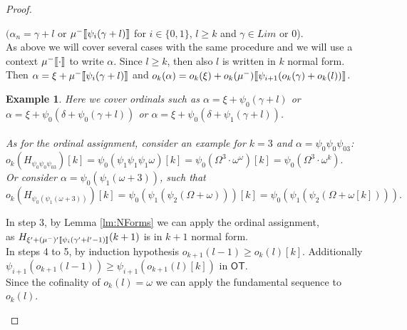 \documentclass{amsart}
\theoremstyle{plain}
\theoremstyle{plain}
\newtheorem{example}[theorem]{Example}
\def\scbrl{[\hspace{-.14em}[}
\def\scbrr{]\hspace{-.14em}]}
\def\scbr#1{\scbrl#1\scbrr}
\newcommand\OT{\mathsf{OT}}
\newcommand{\Om}{{\Omega}}
\newcommand{\okpe}{o_{k+1}}
\newcommand{\ok}{o_{k}}
\newcommand{\al}{{\alpha}}
\newcommand{\ga}{\gamma}
\newcommand{\de}{\delta}
\newcommand{\om}{\omega}
\def\scbrl{[\hspace{-.14em}[}
\def\scbrr{]\hspace{-.14em}]}
\def\scbr#1{\scbrl#1\scbrr}
\begin{document}
\begin{proof}
\begin{Cases}
\begin{Cases}
\begin{Cases}
            
            \item \label{CaseNotSucc} $(\al_n=\ga+l$ or $\mu^-\scbr{\psi_i(\ga+l)}$ for $i \in \{0,1\}$,  $l\geq k$ and $\ga\in Lim$ or $0$).\\
            As above we will cover several cases with the same procedure and we will use a context $\mu^-\scbr{\cdot}$ to write $\al$. Since $l\geq k$, then also $l$ is written in $k$  normal form. Then $\al = \xi + \mu^-\scbr{\psi_i(\ga+l)}$ and $\ok(\al)= \ok(\xi)+ \ok(\mu^-)\scbr{\psi_{i+1}(\ok(\ga)+\ok(l))}$.
            \\
            \begin{example}
                Here we cover ordinals such as $\al = \xi + \psi_0(\ga+l)$ or $\al =\xi+ \psi_0(\de+\psi_0(\ga+l))$ or $\al = \xi+ \psi_0(\de + \psi_1(\ga+l))$. 
                \\
                \\
                As for the ordinal assignment, consider an example for $k=3$ and $\al =\psi_0\psi_0\psi_03$: \\
                $\ok(H_{\psi_0\psi_0\psi_03})[k]= \psi_0(\psi_1\psi_1\psi_1\om)[k] = \psi_0(\Om^3\cdot \om^\om)[k]= \psi_0(\Om^3\cdot \om^{k}).$
                \\
                Or consider $\al = \psi_0(\psi_1(\om + 3 ))$, such that\\ 
                $\ok(H_{\psi_0(\psi_1(\om + 3 ))})[k] = \psi_0(\psi_1( \psi_2(\Om + \om)))[k]  = \psi_0( \psi_1(\psi_2(\Om + \om[k]))).$
                \\
            \end{example}
            In step 3, by Lemma \ref{lm:NForms} we can apply the ordinal assignment, 
            \\as $ H_{\xi'+(\mu^-)'\scbr{\psi_i(\ga'+l'-1)}}(k+1)$ is in $k+1$ normal form. \\
            In steps 4 to 5, by induction hypothesis $\okpe(l-1)\geq \ok(l)[k]$. Additionally
            $\psi_{i+1}(\okpe(l-1)) \geq \psi_{i+1}(\okpe(l)[k])$ in $\OT$.\\
            Since the cofinality of $\ok(l)=\om$ we can apply the fundamental sequence to $\ok(l)$.
            

\end{Cases}
\end{Cases}
\end{Cases}
\end{proof}
\end{document}
